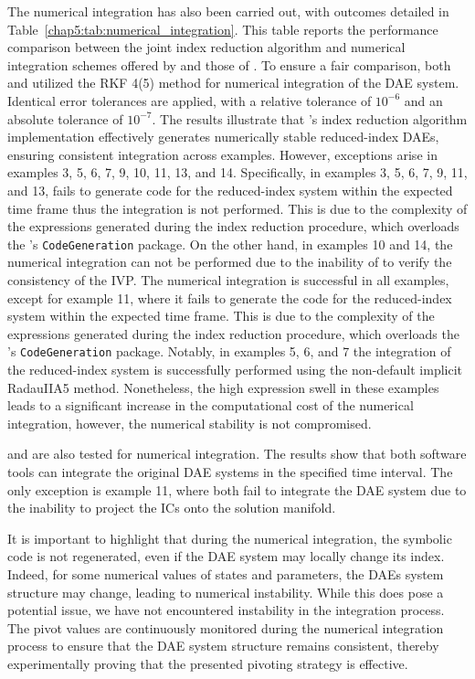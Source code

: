 The numerical integration has also been carried out, with outcomes detailed in Table~\ref{chap5:tab:numerical_integration}. This table reports the performance comparison between the joint index reduction algorithm and numerical integration schemes offered by \Maple{} and those of \Indigo{}. To ensure a fair comparison, both \Maple{} and \Indigo{} utilized the \ac{RKF} 4(5) method for numerical integration of the \ac{DAE} system. Identical error tolerances are applied, with a relative tolerance of $10^{-6}$ and an absolute tolerance of $10^{-7}$. The results illustrate that \Indigo{}'s index reduction algorithm implementation effectively generates numerically stable reduced-index \acp{DAE}, ensuring consistent integration across examples. However, exceptions arise in examples 3, 5, 6, 7, 9, 10, 11, 13, and 14. Specifically, in examples 3, 5, 6, 7, 9, 11, and 13, \Maple{} fails to generate code for the reduced-index system within the expected time frame thus the integration is not performed. This is due to the complexity of the expressions generated during the index reduction procedure, which overloads the \Maple{}'s \texttt{CodeGeneration} package. On the other hand, in examples 10 and 14, the numerical integration can not be performed due to the inability of \Maple{} to verify the consistency of the \ac{IVP}. The \Indigo{} numerical integration is successful in all examples, except for example 11, where it fails to generate the code for the reduced-index system within the expected time frame. This is due to the complexity of the expressions generated during the index reduction procedure, which overloads the \Indigo{}'s \texttt{CodeGeneration} package. Notably, in examples 5, 6, and 7 the integration of the reduced-index system is successfully performed using the non-default implicit RadauIIA5 method. Nonetheless, the high expression swell in these examples leads to a significant increase in the computational cost of the numerical integration, however, the numerical stability is not compromised.

\Mathematica{} and \Matlab{} are also tested for numerical integration. The results show that both software tools can integrate the original \ac{DAE} systems in the specified time interval. The only exception is example 11, where both fail to integrate the \ac{DAE} system due to the inability to project the \acp{IC} onto the solution manifold.

It is important to highlight that during the numerical integration, the symbolic code is not regenerated, even if the \ac{DAE} system may locally change its index. Indeed, for some numerical values of states and parameters, the \acp{DAE} system structure may change, leading to numerical instability. While this does pose a potential issue, we have not encountered instability in the integration process. The pivot values are continuously monitored during the numerical integration process to ensure that the \ac{DAE} system structure remains consistent, thereby experimentally proving that the presented pivoting strategy is effective.



